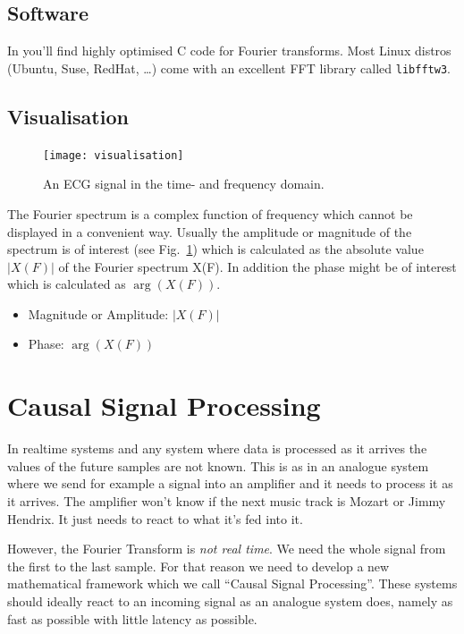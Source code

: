 \documentclass[12pt,a4paper]{article}
\begin{document}
\subsection{Software}
In \citet{NumericalRec2007} you'll find highly optimised C code
for Fourier transforms. Most Linux distros (Ubuntu, Suse, RedHat, \ldots)
come with an excellent FFT library called \texttt{libfftw3}.


\subsection{Visualisation}
\begin{figure}[!hbt]
\begin{center}
\mbox{\texttt{[image: visualisation]}}
\end{center}
\caption{
An ECG signal in the time- and frequency domain.
\label{visualisation}}
\end{figure}
The Fourier spectrum is a complex function of frequency which cannot
be displayed in a convenient way. Usually the amplitude or magnitude
of the spectrum is of interest (see Fig.~\ref{visualisation}) which is calculated as the
absolute value $|X(F)|$ of the Fourier spectrum X(F). In addition
the phase might be of interest which is calculated as $\arg(X(F))$.
\begin{itemize}
\item Magnitude or Amplitude: $|X(F)|$
\item Phase: $\arg(X(F))$
\end{itemize}

\clearpage





\section{Causal Signal Processing}

In realtime systems and any system where data is processed as it
arrives the values of the future samples are not known. This is as in
an analogue system where we send for example a signal into an
amplifier and it needs to process it as it arrives. The amplifier
won't know if the next music track is Mozart or Jimmy Hendrix. It just
needs to react to what it's fed into it.

However, the Fourier Transform is \textsl{not real time}.  We need the
whole signal from the first to the last sample.  For that reason we
need to develop a new mathematical framework which we call ``Causal
Signal Processing''. These systems should ideally react to an incoming
signal as an analogue system does, namely as fast as possible with
little latency as possible.
\end{document}
